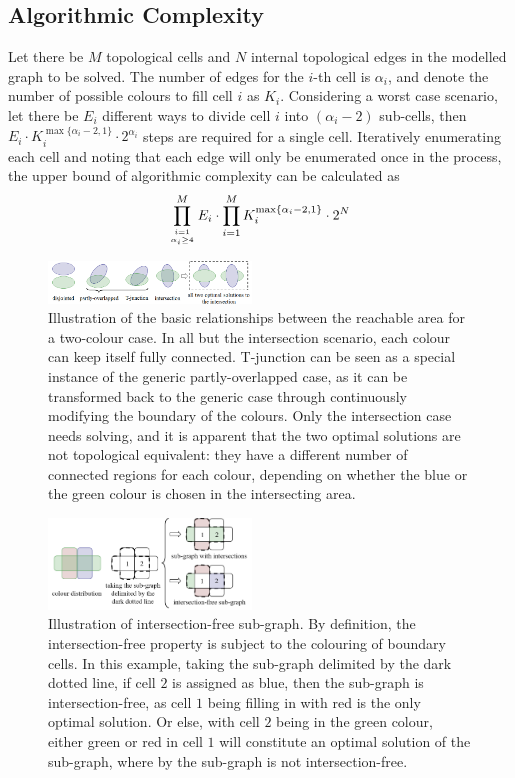 \documentclass[journal]{IEEEtran}
\begin{document}
\subsection{Algorithmic Complexity}

Let there be $M$ topological cells and $N$ internal topological edges in the modelled graph to be solved. The number of edges for the $i$-th cell is $\alpha_i$, and denote the number of possible colours to fill cell $i$ as $K_i$. 
Considering a worst case scenario, let there be $E_i$ different ways to divide cell $i$ into $(\alpha_i-2)$ sub-cells, then $E_i\cdot K_i^{\max\{\alpha_i-2, 1\}}\cdot 2^{\alpha_i}$ steps are required for a single cell. Iteratively enumerating each cell and noting that each edge will only be enumerated once in the process, the upper bound of algorithmic complexity can be calculated as
\begin{equation}\label{equ:tmech_complexity}
\prod\limits_{i=1\atop\alpha_i \geq 4}^{M}E_i\cdot \prod\limits_{i = 1}^M K_i^{\max\{\alpha_i-2, 1\}} \cdot 2^N
\end{equation}


\begin{figure}[t]
\centering
\includegraphics[width = 0.48\textwidth]{figures/basic_shape_3}
\caption{Illustration of the basic relationships between the reachable area for a two-colour case. 
In all but the intersection scenario, each colour can keep itself fully connected. 
T-junction can be seen as a special instance of the generic partly-overlapped case, as it can be transformed back to the generic case through continuously modifying the boundary of the colours. 
Only the intersection case needs solving, and it is apparent that the two optimal solutions are not topological equivalent: they have a different number of connected regions for each colour, depending on whether the blue or the green colour is chosen in the intersecting area.}
\label{fig:basic_shape}
\end{figure}

\begin{figure}[t]
\includegraphics[width=0.48\textwidth]{figures/simple_intersections_indexed}
\caption{Illustration of intersection-free sub-graph. 
By definition, the intersection-free property is subject to the colouring of boundary cells. 
In this example, taking the sub-graph delimited by the dark dotted line, if cell $2$ is assigned as blue, then the sub-graph is intersection-free, as cell $1$ being filling in with red is the only optimal solution. Or else, with cell $2$ being in the green colour, either green or red in cell $1$ will constitute an optimal solution of the sub-graph, where by the sub-graph is not intersection-free. }\label{fig:simple_intersection}
\end{figure}
\end{document}
